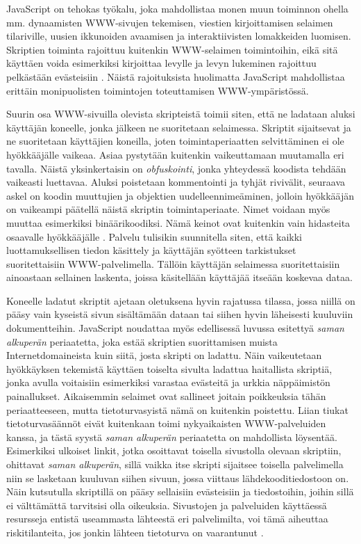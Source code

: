 JavaScript on tehokas työkalu, joka mahdollistaa monen muun toiminnon ohella mm. dynaamisten WWW-sivujen tekemisen, viestien kirjoittamisen selaimen tilariville, uusien ikkunoiden
avaamisen ja interaktiivisten lomakkeiden luomisen. Skriptien toiminta rajoittuu kuitenkin WWW-selaimen toimintoihin, eikä sitä käyttäen voida esimerkiksi kirjoittaa levylle ja levyn 
lukeminen rajoittuu pelkästään evästeisiin \cite{JavaScript}. Näistä rajoituksista huolimatta JavaScript mahdollistaa erittäin monipuolisten toimintojen toteuttamisen WWW-ympäristössä.

Suurin osa WWW-sivuilla olevista skripteistä toimii siten, että ne ladataan aluksi käyttäjän koneelle, jonka jälkeen ne suoritetaan selaimessa. Skriptit sijaitsevat ja ne suoritetaan 
käyttäjien koneilla, joten toimintaperiaatten selvittäminen ei ole hyökkääjälle vaikeaa. Asiaa pystytään kuitenkin vaikeuttamaan muutamalla eri tavalla. Näistä yksinkertaisin on 
\emph{obfuskointi}, jonka yhteydessä koodista tehdään vaikeasti luettavaa. Aluksi poistetaan kommentointi ja tyhjät rivivälit, seuraava askel on koodin muuttujien ja objektien
uudelleennimeäminen, jolloin hyökkääjän on vaikeampi päätellä näistä skriptin toimintaperiaate. Nimet voidaan myös muuttaa esimerkiksi binäärikoodiksi. Nämä keinot ovat kuitenkin 
vain hidasteita osaavalle hyökkääjälle \cite{AJAX}. Palvelu tulisikin suunnitella siten, että kaikki luottamuksellisen tiedon käsittely ja käyttäjän syötteen tarkistukset suoritettaisiin
WWW-palvelimella. Tällöin käyttäjän selaimessa suoritettaisiin ainoastaan sellainen laskenta, joissa käsitellään käyttäjää itseään koskevaa dataa.

Koneelle ladatut skriptit ajetaan oletuksena hyvin rajatussa tilassa, jossa niillä on pääsy vain kyseistä sivun sisältämään dataan tai siihen hyvin läheisesti kuuluviin dokumentteihin. 
JavaScript noudattaa myös  edellisessä luvussa esitettyä \emph{saman alkuperän} periaatetta, joka estää skriptien suorittamisen muista Internetdomaineista kuin siitä, josta skripti on
ladattu. Näin vaikeutetaan hyökkäyksen tekemistä käyttäen toiselta sivulta ladattua haitallista skriptiä, jonka avulla voitaisiin esimerkiksi varastaa evästeitä ja urkkia näppäimistön
painallukset.  Aikaisemmin selaimet ovat sallineet joitain poikkeuksia tähän periaatteeseen, mutta tietoturvasyistä nämä on kuitenkin poistettu. Liian tiukat tietoturvasäännöt eivät 
kuitenkaan toimi nykyaikaisten WWW-palveluiden kanssa, ja tästä syystä \emph{saman alkuperän} periaatetta on mahdollista löysentää. Esimerkiksi ulkoiset linkit, jotka osoittavat toisella
sivustolla olevaan skriptiin, ohittavat \emph{saman alkuperän}, sillä vaikka itse skripti sijaitsee toisella palvelimella niin se lasketaan kuuluvan siihen sivuun, jossa viittaus
lähdekooditiedostoon on.  Näin kutsutulla skriptillä on pääsy sellaisiin evästeisiin ja tiedostoihin, joihin sillä ei välttämättä tarvitsisi olla oikeuksia. Sivustojen ja palveluiden 
käyttäessä resursseja entistä useammasta lähteestä eri palvelimilta, voi tämä aiheuttaa riskitilanteita, jos jonkin lähteen tietoturva on vaarantunut \cite{AJAX}.

